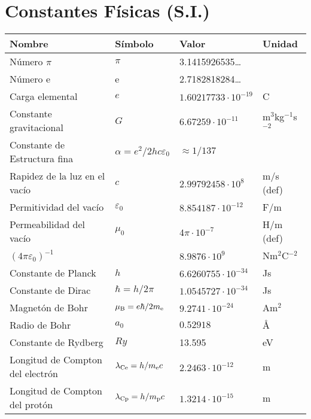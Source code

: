 \chapter{Constantes Físicas (S.I.)}\label{app:constantes}
\begin{center}
\begin{tabular}{||l|lll||}
\hline
{\bf Nombre}&{\bf Símbolo}&{\bf Valor}&{\bf Unidad}\\
\hline
\hline
Número $\pi$                 &$\pi$&3.1415926535\dots&\\
Número e                     &e    &2.7182818284\dots&\\
\hline
Carga elemental            &$e$&$1.60217733\cdot10^{-19}$&C\rule{0pt}{13pt}\\
Constante gravitacional  &$G$&$6.67259\cdot10^{-11}$&m$^3$kg$^{-1}$s$^{-2}$\\
Constante de Estructura fina &$\alpha=e^2/2hc\varepsilon_0$&$\approx1/137$&\\
Rapidez de la luz en el vacío    &$c$&$2.99792458\cdot10^8$&m/s (def)\\
Permitividad del vacío   &$\varepsilon_0$&$8.854187\cdot10^{-12}$&F/m\\
Permeabilidad del vacío &$\mu_0$&$4\pi\cdot10^{-7}$&H/m (def)\\
$(4\pi\varepsilon_0)^{-1}$   &&$8.9876\cdot10^9$&Nm$^2$C$^{-2}$\\
\hline
Constante de Planck           &$h$&$6.6260755\cdot10^{-34}$&Js\rule{0pt}{13pt}\\
Constante de Dirac             &$\hbar=h/2\pi$&$1.0545727\cdot10^{-34}$&Js\\
Magnetón de Bohr              &$\mu_{\rm B}=e\hbar/2m_{\rm e}$&$9.2741\cdot10^{-24}$&Am$^2$\\
Radio de Bohr                 &$a_0$&$0.52918$&\AA\\
Constante de Rydberg     &$Ry$&13.595&eV\\
Longitud de Compton del electrón  &$\lambda_{\rm Ce}=h/m_{\rm e} c$&$2.2463\cdot10^{-12}$&m\\
Longitud de Compton del protón   &$\lambda_{\rm Cp}=h/m_{\rm p}c$&$1.3214\cdot10^{-15}$&m\\

\end{tabular}
\end{center}

